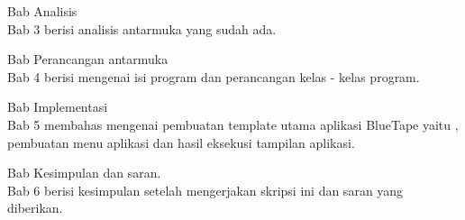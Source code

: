 \begin{singlespace}
\noindent Bab Analisis \\
Bab 3 berisi analisis antarmuka yang sudah ada.
\end{singlespace}

\begin{singlespace}
\noindent Bab Perancangan antarmuka \\
Bab 4 berisi mengenai isi program dan perancangan kelas - kelas program.
\end{singlespace}

\begin{singlespace}
\noindent Bab Implementasi \\
Bab 5 membahas mengenai pembuatan template utama aplikasi BlueTape yaitu , pembuatan menu aplikasi dan hasil eksekusi tampilan aplikasi. 
\end{singlespace}

\begin{singlespace}
\noindent Bab Kesimpulan dan saran.\\
Bab 6 berisi kesimpulan setelah mengerjakan skripsi ini dan saran yang diberikan.
\end{singlespace}
